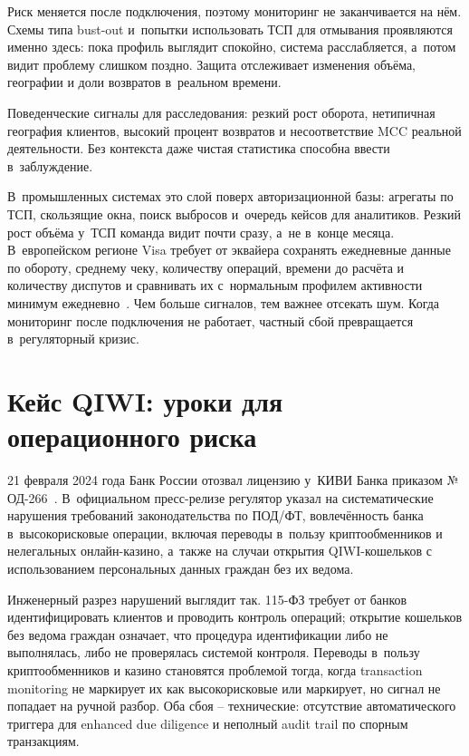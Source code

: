 Риск меняется после подключения, поэтому мониторинг не заканчивается
на нём. Схемы типа bust-out и~попытки использовать ТСП для отмывания
проявляются именно здесь: пока профиль выглядит спокойно, система
расслабляется, а~потом видит проблему слишком поздно. Защита
отслеживает изменения объёма, географии и доли возвратов в~реальном
времени.

Поведенческие сигналы для расследования:
резкий рост оборота, нетипичная география клиентов, высокий процент
возвратов и несоответствие MCC реальной деятельности. Без контекста даже чистая статистика способна
ввести в~заблуждение.

В~промышленных системах это слой поверх авторизационной базы:
агрегаты по ТСП, скользящие окна, поиск выбросов и~очередь кейсов
для аналитиков. Резкий рост объёма у~ТСП команда видит почти сразу,
а~не в~конце месяца. В~европейском регионе Visa требует от эквайера
сохранять ежедневные данные по обороту, среднему чеку, количеству
операций, времени до расчёта и количеству диспутов и сравнивать их
с~нормальным профилем активности минимум ежедневно~\cite{visa-core-rules}.
Чем больше сигналов, тем важнее отсекать шум. Когда мониторинг после
подключения не работает, частный сбой превращается в~регуляторный
кризис.

\section{Кейс QIWI: уроки для операционного риска}\label{sec:compliance-qiwi}

21 февраля 2024 года Банк России отозвал лицензию
у~КИВИ Банка приказом № ОД-266~\cite{cbr-qiwi-license-2024}. В~официальном пресс-релизе
регулятор указал на систематические нарушения требований
законодательства по ПОД/ФТ, вовлечённость банка в~высокорисковые
операции, включая переводы в~пользу криптообменников и нелегальных
онлайн-казино, а~также на случаи открытия QIWI-кошельков с
использованием персональных данных граждан без их ведома.

Инженерный разрез нарушений выглядит так. 115-ФЗ требует от банков
идентифицировать клиентов и проводить контроль операций; открытие
кошельков без ведома граждан означает, что процедура идентификации
либо не выполнялась, либо не проверялась системой контроля.
Переводы в~пользу криптообменников и казино становятся проблемой
тогда, когда transaction monitoring не маркирует их как высокорисковые
или маркирует, но сигнал не попадает на ручной разбор. Оба сбоя --
технические: отсутствие автоматического триггера для enhanced due
diligence и неполный audit trail по спорным транзакциям.

